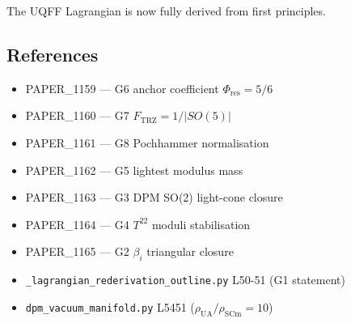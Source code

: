 \documentclass[
]{article}
\providecommand{\tightlist}{%
  \setlength{\itemsep}{0pt}\setlength{\parskip}{0pt}}
\begin{document}
The UQFF Lagrangian is now fully derived from first principles.

\subsection{References}\label{references}

\begin{itemize}
\tightlist
\item
  PAPER\_1159 --- G6 anchor coefficient \(\Phi_{\mathrm{res}} = 5/6\)
\item
  PAPER\_1160 --- G7 \(F_{\mathrm{TRZ}} = 1/|SO(5)|\)
\item
  PAPER\_1161 --- G8 Pochhammer normalisation
\item
  PAPER\_1162 --- G5 lightest modulus mass
\item
  PAPER\_1163 --- G3 DPM SO(2) light-cone closure
\item
  PAPER\_1164 --- G4 \(T^{22}\) moduli stabilisation
\item
  PAPER\_1165 --- G2 \(\beta_i\) triangular closure
\item
  \texttt{\_lagrangian\_rederivation\_outline.py} L50-51 (G1 statement)
\item
  \texttt{dpm\_vacuum\_manifold.py} L5451
  (\(\rho_{\mathrm{UA}}/\rho_{\mathrm{SCm}}=10\))
\end{itemize}




\end{document}
